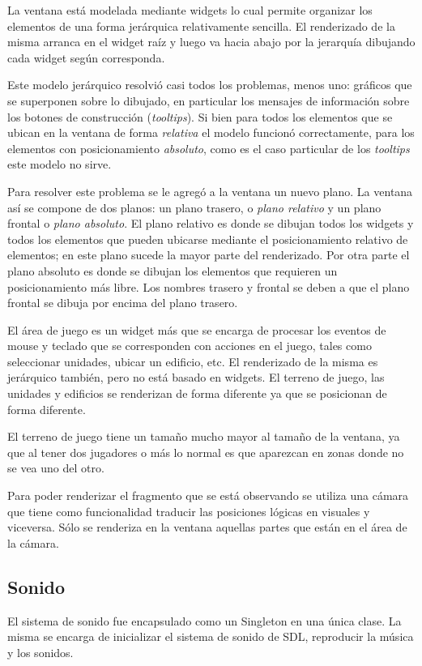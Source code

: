 \documentclass[titlepage,a4paper,12pt]{article}
\begin{document}
La ventana está modelada mediante widgets lo cual permite organizar los elementos de una forma jerárquica relativamente sencilla. El renderizado de la misma arranca en el widget raíz y luego va hacia abajo por la jerarquía dibujando cada widget según corresponda. 

Este modelo jerárquico resolvió casi todos los problemas, menos uno: gráficos que se superponen sobre lo dibujado, en particular los mensajes de información sobre los botones de construcción (\textit{tooltips}). Si bien para todos los elementos que se ubican en la ventana de forma \textit{relativa} el modelo funcionó correctamente, para los elementos con posicionamiento \textit{absoluto}, como es el caso particular de los \textit{tooltips} este modelo no sirve. 

Para resolver este problema se le agregó a la ventana un nuevo plano. La ventana así se compone de dos planos: un plano trasero, o \textit{plano relativo} y un plano frontal o \textit{plano absoluto}. El plano relativo es donde se dibujan todos los widgets y todos los elementos que pueden ubicarse mediante el posicionamiento relativo de elementos; en este plano sucede la mayor parte del renderizado. Por otra parte el plano absoluto es donde se dibujan los elementos que requieren un posicionamiento más libre.
Los nombres trasero y frontal se deben a que el plano frontal se dibuja por encima del plano trasero.

El área de juego es un widget más que se encarga de procesar los eventos de mouse y teclado que se corresponden con acciones en el juego, tales como seleccionar unidades, ubicar un edificio, etc. 
El renderizado de la misma es jerárquico también, pero no está basado en widgets. El terreno de juego, las unidades y edificios se renderizan de forma diferente ya que se posicionan de forma diferente.

El terreno de juego tiene un tamaño mucho mayor al tamaño de la ventana, ya que al tener dos jugadores o más lo normal es que aparezcan en zonas donde no se vea uno del otro. 

Para poder renderizar el fragmento que se está observando se utiliza una cámara que tiene como funcionalidad traducir las posiciones lógicas en visuales y viceversa. Sólo se renderiza en la ventana aquellas partes que están en el área de la cámara. 

\subsection{Sonido}
El sistema de sonido fue encapsulado como un Singleton en una única clase. La misma se encarga de inicializar el sistema de sonido de SDL, reproducir la música y los sonidos.
\end{document}
